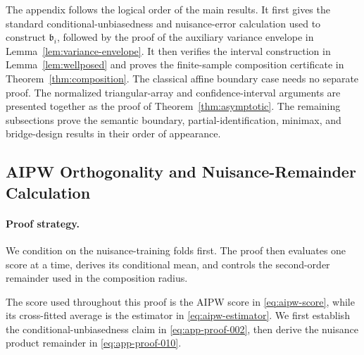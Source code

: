 \documentclass[11pt]{article}
\numberwithin{equation}{section}
\newcommand{\1}{\mathbf 1}
\begin{document}
The appendix follows the logical order of the main results.  It first gives
the standard conditional-unbiasedness and nuisance-error calculation used to
construct \(\mathfrak b_i\), followed by the proof of the auxiliary variance
envelope in Lemma~\ref{lem:variance-envelope}.  It then verifies the interval
construction in Lemma~\ref{lem:wellposed} and proves the finite-sample
composition certificate in Theorem~\ref{thm:composition}.  The classical
affine boundary case needs no separate proof.  The normalized triangular-array
and confidence-interval arguments are presented together as the proof of
Theorem~\ref{thm:asymptotic}.  The remaining subsections prove the semantic
boundary, partial-identification, minimax, and bridge-design results in their
order of appearance.

\subsection{AIPW Orthogonality and Nuisance-Remainder Calculation}
\label{app:aipw-calculation}

\paragraph{Proof strategy.} We condition on the nuisance-training folds first.  The proof then evaluates one score at a time, derives its conditional mean, and controls the second-order remainder used in the composition radius.

The score used throughout this proof is the AIPW score in
\eqref{eq:aipw-score}, while its cross-fitted average is the estimator in
\eqref{eq:aipw-estimator}.  We first establish the conditional-unbiasedness
claim in \eqref{eq:app-proof-002}, then derive the nuisance product remainder
in \eqref{eq:app-proof-010}.
\end{document}
